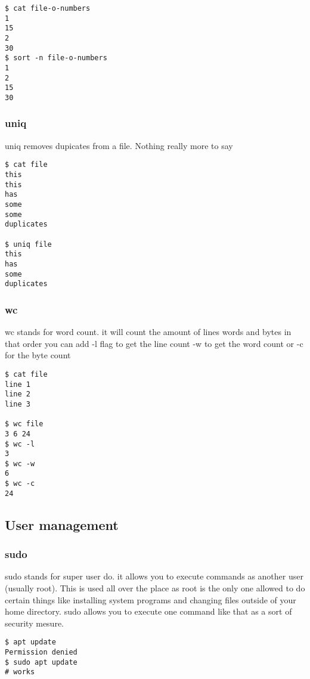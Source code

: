 \documentclass[a4paper]{article}
\begin{document}
\begin{verbatim}
$ cat file-o-numbers
1
15
2
30
$ sort -n file-o-numbers
1
2
15
30
\end{verbatim}
\subsubsection*{uniq}
\label{sec:orgbda7936}
\begin{notes}
	uniq removes dupicates from a file. Nothing really more to say
\end{notes}

\begin{verbatim}
$ cat file
this
this
has
some
some
duplicates

$ uniq file
this
has
some
duplicates
\end{verbatim}
\subsubsection*{wc}
\label{sec:orgcaccd9d}
\begin{notes}
	wc stands for word count. it will count the amount of lines words and bytes in
	that order you can add -l flag to get the line count -w to get the word count or
	-c for the byte count
\end{notes}

\begin{verbatim}
$ cat file
line 1
line 2
line 3

$ wc file
3 6 24
$ wc -l
3
$ wc -w
6
$ wc -c
24
\end{verbatim}
\subsection*{User management}
\label{sec:org056730c}
\subsubsection*{sudo}
\label{sec:org5faebfc}
\begin{notes}
	sudo stands for super user do. it allows you to execute commands as another user
	(usually root). This is used all over the place as root is the only one allowed
	to do certain things like installing system programs and changing files outside
	of your home directory. sudo allows you to execute one command like that as a
	sort of security mesure.
\end{notes}

\begin{verbatim}
$ apt update
Permission denied
$ sudo apt update
# works
\end{verbatim}
\end{document}
